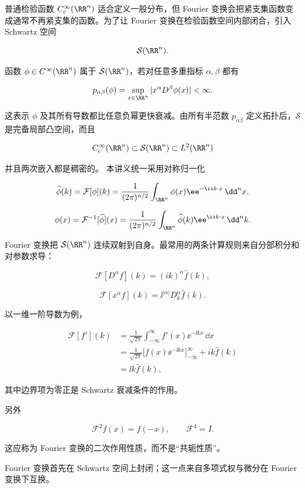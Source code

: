 普通检验函数 $C_c^\infty(\RR^n)$ 适合定义一般分布，但 Fourier 变换会把紧支集函数变成通常不再紧支集的函数。为了让 Fourier 变换在检验函数空间内部闭合，引入 Schwartz 空间

\[
\mathcal S(\RR^n).
\]

函数 $\phi\in C^\infty(\RR^n)$ 属于 $\mathcal S(\RR^n)$，若对任意多重指标 $\alpha,\beta$ 都有

\[
p_{\alpha\beta}(\phi)
=\sup_{x\in\RR^n}|x^\alpha D^\beta\phi(x)|<\infty.
\]

这表示 $\phi$ 及其所有导数都比任意负幂更快衰减。由所有半范数 $p_{\alpha\beta}$ 定义拓扑后，$\mathcal S$ 是完备局部凸空间，而且

\[
C_c^\infty(\RR^n)\subset\mathcal S(\RR^n)\subset L^2(\RR^n)
\]

并且两次嵌入都是稠密的。
本讲义统一采用对称归一化

\begin{equation*}\widehat\phi(k)=\mathcal F[\phi](k)
=\frac1{(2\pi)^{n/2}}
\int_{\RR^n}\phi(x)\ee^{-\ii k\cdot x}\,\dd^n x,\end{equation*}

\[
\phi(x)=\mathcal F^{-1}[\widehat\phi](x)
=\frac1{(2\pi)^{n/2}}
\int_{\RR^n}\widehat\phi(k)\ee^{\ii k\cdot x}\,\dd^n k.
\]

Fourier 变换把 $\mathcal S(\RR^n)$ 连续双射到自身。最常用的两条计算规则来自分部积分和对参数求导：

\[
\mathcal F[D^\alpha f](k)=(ik)^\alpha\widehat f(k),
\]

\[
\mathcal F[x^\alpha f](k)=\ii^{|\alpha|}D_k^\alpha\widehat f(k).
\]

以一维一阶导数为例，

\[
\begin{aligned}
\mathcal F[f'](k)
&=\frac1{\sqrt{2\pi}}\int_{-\infty}^{\infty}f'(x)\ee^{-\ii kx}\,\dd x\\
&=\frac1{\sqrt{2\pi}}\Big[f(x)\ee^{-\ii kx}\Big]_{-\infty}^{\infty}
+ik\widehat f(k)\\
&=\ii k\widehat f(k),
\end{aligned}
\]

其中边界项为零正是 Schwartz 衰减条件的作用。

另外

\[
\mathcal F^2f(x)=f(-x),\qquad \mathcal F^4=I.
\]

这应称为 Fourier 变换的二次作用性质，而不是``共轭性质''。

Fourier 变换首先在 Schwartz 空间上封闭；这一点来自多项式权与微分在 Fourier 变换下互换。

